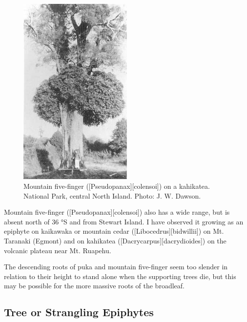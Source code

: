 \begin{figure}
	\includegraphics[width=0.5\textwidth]{graphics/figure49fivefinger.jpg}
	\centering
	\caption[Mountain five-finger on a kahikatea]{Mountain five-finger ([Pseudopanax][colensoi]) on a kahikatea.
National Park, central North Island.
	Photo: J. W. Dawson.}%
	\label{fig:49fivefinger}
\end{figure}

Mountain five-finger ([Pseudopanax][colensoi]) also has a wide range, but is absent north of 36 °S and from Stewart Island.
I have observed it growing as an epiphyte on kaikawaka or mountain cedar ([Libocedrus][bidwillii]) on Mt.
Taranaki (Egmont) and on kahikatea ([Dacrycarpus][dacrydioides]) on the volcanic plateau near Mt.
Ruapehu.

The descending roots of puka and mountain five-finger seem too slender in relation to their height to stand alone when the supporting trees die, but this may be possible for the more massive roots of the broadleaf.

\subsection{Tree or Strangling Epiphytes}

